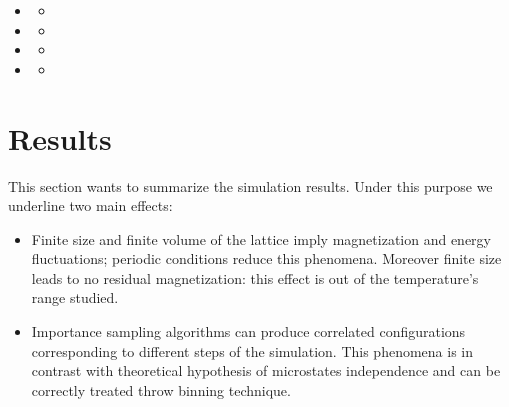 \documentclass[11pt,a4paper]{article}
\begin{document}
\begin{itemize}
\begin{itemize}
			\item[] 		 
			\begin{itemize}
				\item[] 
			\end{itemize}
			
			\item[] 		 
			\begin{itemize}
				\item[] 
			\end{itemize}
			
			\item[] 		 
			\begin{itemize}
				\item[] 
			\end{itemize}
			
			\item[] 		 
			\begin{itemize}
				\item[] 
			\end{itemize}
		
		
			
	\end{itemize}

	
\end{itemize}





























\newpage
\section{Results}
This section wants to summarize the simulation results. Under this purpose we underline two main effects:

\begin{itemize}
\item Finite size and finite volume of the lattice imply magnetization and energy fluctuations; periodic conditions reduce this phenomena. Moreover finite size leads to no residual magnetization: this effect is out of the temperature's range studied.

\item Importance sampling algorithms can produce correlated configurations corresponding to different steps of the simulation. This phenomena is in contrast with theoretical hypothesis of microstates independence and can be correctly treated throw binning technique. 

\end{itemize}
\end{document}
